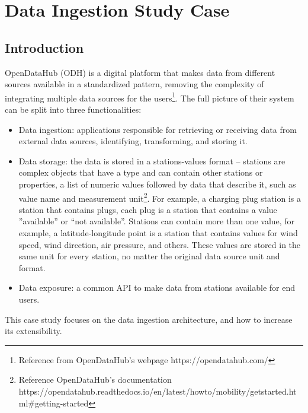 \newcommand{\sla}{\textbackslash}

\newcommand{\cmd}[1]{\textsf{#1}}

\newcommand{\pkg}[1]{\textsf{#1}}

\newcommand{\ltxcmd}[1]{\cmd{\sla{}#1}}

\chapter{Data Ingestion Study Case}
\label{chap:dataingestion}

\section{Introduction}
\label{sec:introductioning}
OpenDataHub (ODH) is a digital platform that makes data from different sources available in a standardized pattern, removing the complexity of integrating multiple data sources for the users\footnote{Reference from OpenDataHub's webpage https://opendatahub.com/}. The full picture of their system can be split into three functionalities:

\begin{itemize}
    \item Data ingestion: applications responsible for retrieving or receiving data from external data sources, identifying, transforming, and storing it.
    \item Data storage: the data is stored in a stations-values format  – stations are complex objects that have a type and can contain other stations or properties, a list of numeric values followed by data that describe it, such as value name and measurement unit\footnote{Reference OpenDataHub's documentation https://opendatahub.readthedocs.io/en/latest/howto/mobility/getstarted.html#getting-started}. For example, a charging plug station is a station that contains plugs, each plug is a station that contains a value ”available” or “not available”. Stations can contain more than one value, for example, a latitude-longitude point is a station that contains values for wind speed, wind direction, air pressure, and others. These values are stored in the same unit for every station, no matter the original data source unit and format.
    \item Data exposure: a common API to make data from stations available for end users.
\end{itemize}

This case study focuses on the data ingestion architecture, and how to increase its extensibility.

